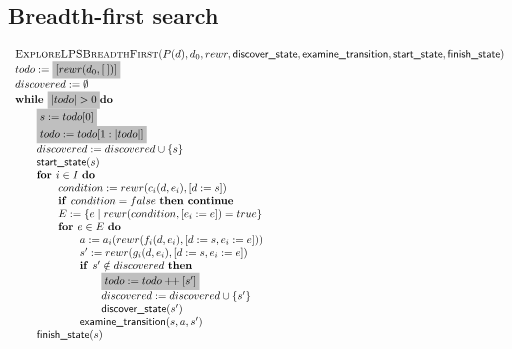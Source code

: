 \documentclass{article}
\newcommand{\concat}{\ensuremath{+\!\!+\:}}
\newcommand{\Space}{\text{\ }}
\newcommand{\If}{\text{\textbf{if }}}
\newcommand{\Do}{\text{\textbf{do }}}
\newcommand{\Then}{\text{\textbf{then }}}
\newcommand{\For}{\text{\textbf{for }}}
\newcommand{\While}{\text{\textbf{while }}}
\newcommand{\Continue}{\text{\textbf{continue }}}
\begin{document}
\subsection{Breadth-first search}
\[
\begin{tabular}{l}
\textsc{ExploreLPSBreadthFirst}($P(d), d_0, rewr, \textsf{discover\_state}, \textsf{examine\_transition},
\textsf{start\_state}, \textsf{finish\_state})$ \\
$todo := \colorbox{lightgray}{$[rewr(d_0, [\:])]$}$ \\
$discovered := \emptyset$ \\
$\While \colorbox{lightgray}{$|todo| > 0$} \Do$ \\
\qquad \colorbox{lightgray}{$s := todo[0]$} \\
\qquad \colorbox{lightgray}{$todo := todo[1:|todo|]$} \\
\qquad $discovered := discovered \cup \{s\}$ \\
\qquad $\textsf{start\_state}(s)$ \\
\qquad $\For i \in I  \Space \Do$ \\
\qquad \qquad $condition := rewr(c_i(d, e_i), [d := s])$ \\
\qquad \qquad $\If condition = false  \Space \Then \Continue$ \\
\qquad \qquad $E := \{ e \mid rewr(condition, [e_i := e]) = true \}$ \\
\qquad \qquad $\For e \in E  \Space \Do$ \\
\qquad \qquad \qquad $a := a_i(rewr(f_i(d,e_i), [d:=s,e_i:=e]))$ \\
\qquad \qquad \qquad $s' := rewr(g_i(d,e_i), [d:=s,e_i:=e])$ \\
\qquad \qquad \qquad $\If s' \notin discovered \Space \Then$ \\
\qquad \qquad \qquad \qquad \colorbox{lightgray}{$todo := todo \concat [s']$} \\
\qquad \qquad \qquad \qquad $discovered := discovered \cup \{s'\}$ \\
\qquad \qquad \qquad \qquad $\textsf{discover\_state}(s')$ \\
\qquad \qquad \qquad $\textsf{examine\_transition}(s, a, s')$ \\
\qquad $\textsf{finish\_state}(s)$ \\
\end{tabular}
\]
\end{document}
